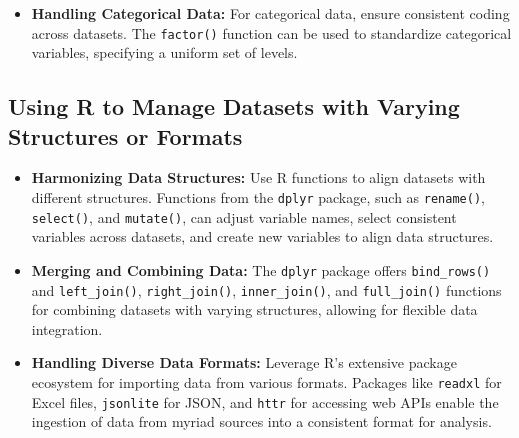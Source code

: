 \documentclass[
]{book}
\newenvironment{Shaded}{\begin{snugshade}}{\end{snugshade}}
\newcommand{\AttributeTok}[1]{\textcolor[rgb]{0.13,0.29,0.53}{#1}}
\newcommand{\FunctionTok}[1]{\textcolor[rgb]{0.13,0.29,0.53}{\textbf{#1}}}
\newcommand{\NormalTok}[1]{#1}
\newcommand{\OtherTok}[1]{\textcolor[rgb]{0.56,0.35,0.01}{#1}}
\newcommand{\SpecialCharTok}[1]{\textcolor[rgb]{0.81,0.36,0.00}{\textbf{#1}}}
\newcommand{\StringTok}[1]{\textcolor[rgb]{0.31,0.60,0.02}{#1}}
\providecommand{\tightlist}{%
  \setlength{\itemsep}{0pt}\setlength{\parskip}{0pt}}
\begin{document}
\begin{itemize}
\tightlist
\item
  \textbf{Handling Categorical Data:} For categorical data, ensure consistent coding across datasets. The \texttt{factor()} function can be used to standardize categorical variables, specifying a uniform set of levels.
\end{itemize}

\begin{Shaded}
\end{Shaded}

\hypertarget{using-r-to-manage-datasets-with-varying-structures-or-formats}{%
\subsection*{Using R to Manage Datasets with Varying Structures or Formats}\label{using-r-to-manage-datasets-with-varying-structures-or-formats}}

\begin{itemize}
\item
  \textbf{Harmonizing Data Structures:} Use R functions to align datasets with different structures. Functions from the \texttt{dplyr} package, such as \texttt{rename()}, \texttt{select()}, and \texttt{mutate()}, can adjust variable names, select consistent variables across datasets, and create new variables to align data structures.
\item
  \textbf{Merging and Combining Data:} The \texttt{dplyr} package offers \texttt{bind\_rows()} and \texttt{left\_join()}, \texttt{right\_join()}, \texttt{inner\_join()}, and \texttt{full\_join()} functions for combining datasets with varying structures, allowing for flexible data integration.
\item
  \textbf{Handling Diverse Data Formats:} Leverage R's extensive package ecosystem for importing data from various formats. Packages like \texttt{readxl} for Excel files, \texttt{jsonlite} for JSON, and \texttt{httr} for accessing web APIs enable the ingestion of data from myriad sources into a consistent format for analysis.
\end{itemize}
\end{document}
